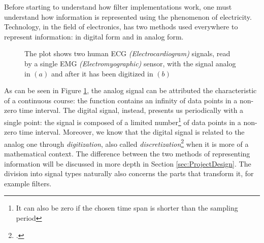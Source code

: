\documentclass[a4paper, 10pt, final]{article} %
\newcommand{\parenciteit}[2]{\textit{\parencite[#1]{#2}}} %
\begin{document}
    Before starting to understand how filter implementations work, one must understand how information is represented using the phenomenon of electricity.
    Technology, in the field of electronics, has two methods used everywhere to represent information: in digital form and in analog form.
    \begin{figure}[H]
        \centering
        \caption{The plot shows two human ECG \emph{(Electrocardiogram)} signals, read by a single EMG \emph{(Electromyographic)} sensor, with the signal analog in $(a)$ and after it has been digitized in $(b)$ \parenciteit{}{ECGDataThesis}\parenciteit{}{ECGData}}
        \label{fig:AnalogDigital}
    \end{figure}

    As can be seen in Figure \ref{fig:AnalogDigital}, the analog signal can be attributed the characteristic of a continuous course: the function contains an infinity of data points in a non-zero time interval.
    The digital signal, instead, presents us periodically with a single point: the signal is composed of a limited number\footnote{It can also be zero if the chosen time span is shorter than the sampling period} of data points in a non-zero time interval.
    Moreover, we know that the digital signal is related to the analog one through \emph{digitization}, also called \emph{discretization}\footcite["Process of transferring continuous functions, models, variables, and equations into discrete counterparts"]{Discretization:Wiki} when it is more of a mathematical context.
    The difference between the two methods of representing information will be discussed in more depth in Section \ref{sec:ProjectDesign}.
    The division into signal types naturally also concerns the parts that transform it, for example filters.
\end{document}
